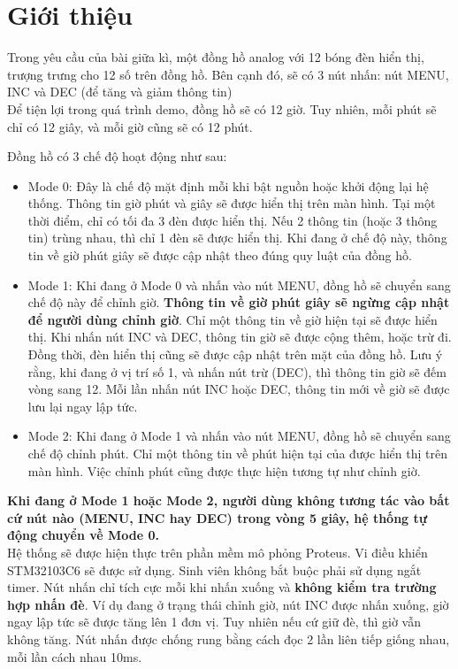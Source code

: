\section{Giới thiệu}
Trong yêu cầu của bài giữa kì, một đồng hồ analog với 12 bóng đèn hiển thị, trượng trưng cho 12 số trên đồng hồ. Bên cạnh đó, sẽ có 3 nút nhấn: nút MENU, INC và DEC (để tăng và giảm thông tin)\\

Để tiện lợi trong quá trình demo, đồng hồ sẽ có 12 giờ. Tuy nhiên, mỗi phút sẽ chỉ có 12 giây, và mỗi giờ cũng sẽ có 12 phút. 

Đồng hồ có 3 chế độ hoạt động như sau:
\begin{itemize}
    \item Mode 0: Đây là chế độ mặt định mỗi khi bật nguồn hoặc khởi động lại hệ thống. Thông tin giờ phút và giây sẽ được hiển thị trên màn hình. Tại một thời điểm, chỉ có tối đa 3 đèn được hiển thị. Nếu 2 thông tin (hoặc 3 thông tin) trùng nhau, thì chỉ 1 đèn sẽ được hiển thị. Khi đang ở chế độ này, thông tin về giờ phút giây sẽ được cập nhật theo đúng quy luật của đồng hồ.
    \item Mode 1: Khi đang ở Mode 0 và nhấn vào nút MENU, đồng hồ sẽ chuyển sang chế độ này để chỉnh giờ. \textbf{Thông tin về giờ phút giây sẽ ngừng cập nhật để người dùng chỉnh giờ}.  Chỉ một thông tin về giờ hiện tại sẽ được hiển thị. Khi nhấn nút INC và DEC, thông tin giờ sẽ được cộng thêm, hoặc trừ đi. Đồng thời, đèn hiển thị cũng sẽ được cập nhật trên mặt của đồng hồ. Lưu ý rằng, khi đang ở vị trí số 1, và nhấn nút trừ (DEC), thì thông tin giờ sẽ đếm vòng sang 12. Mỗi lần nhấn nút INC hoặc DEC, thông tin mới về giờ sẽ được lưu lại ngay lập tức.
    
    \item Mode 2: Khi đang ở Mode 1 và nhấn vào nút MENU, đồng hồ sẽ chuyển sang chế độ chỉnh phút. Chỉ một thông tin về phút hiện tại của được hiển thị trên màn hình. Việc chỉnh phút cũng được thực hiện tương tự như chỉnh giờ.
\end{itemize}

\textbf{Khi đang ở Mode 1 hoặc Mode 2, người dùng không tương tác vào bất cứ nút nào (MENU, INC hay DEC) trong vòng 5 giây, hệ thống tự động chuyển về Mode 0.}\\


Hệ thống sẽ được hiện thực trên phần mềm mô phỏng Proteus. Vi điều khiển STM32103C6 sẽ được sử dụng. Sinh viên không bắt buộc phải sử dụng ngắt timer. Nút nhấn chỉ tích cực mỗi khi nhấn xuống và \textbf{không kiểm tra trường hợp nhấn đè}. Ví dụ đang ở trạng thái chỉnh giờ, nút INC được nhấn xuống, giờ ngay lập tức sẽ được tăng lên 1 đơn vị. Tuy nhiên nếu cứ giữ đè, thì giờ vẫn không tăng. Nút nhấn được chống rung bằng cách đọc 2 lần liên tiếp giống nhau, mỗi lần cách nhau 10ms.



